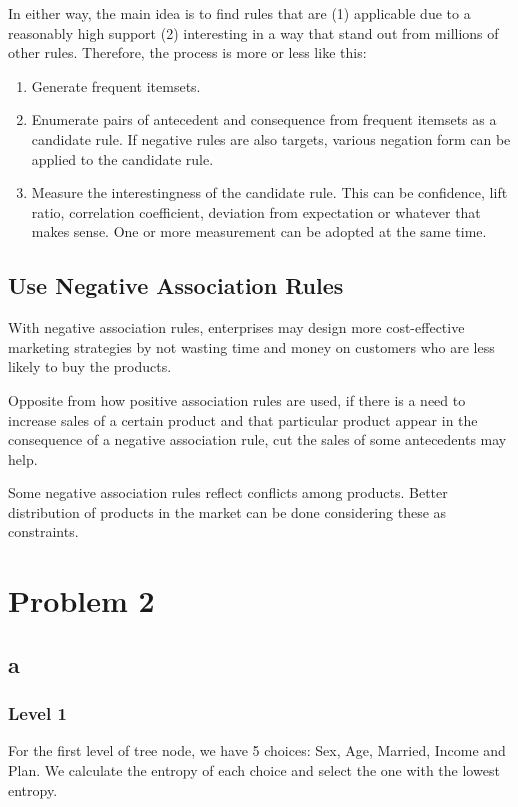 \documentclass[12pt]{article}
\begin{document}
In either way, the main idea is to find rules that are (1) applicable due to a reasonably high support (2) interesting in a way that stand out from millions of other rules. Therefore, the process is more or less like this:
\begin{enumerate}
	\item Generate frequent itemsets.
	\item Enumerate pairs of antecedent and consequence from frequent itemsets as a candidate rule. If negative rules are also targets, various negation form can be applied to the candidate rule.
	\item Measure the interestingness of the candidate rule. This can be confidence, lift ratio, correlation coefficient, deviation from expectation or whatever that makes sense. One or more measurement can be adopted at the same time.
\end{enumerate}

\subsection{Use Negative Association Rules} %
\label{sub:how_to_use_negative_association_rules}
With negative association rules, enterprises may design more cost-effective marketing strategies by not wasting time and money on customers who are less likely to buy the products.

Opposite from how positive association rules are used, if there is a need to increase sales of a certain product and that particular product appear in the consequence of a negative association rule, cut the sales of some antecedents may help.

Some negative association rules reflect conflicts among products. Better distribution of products in the market can be done considering these as constraints.

\section{Problem 2}
\subsection{a}
\subsubsection{Level 1}
For the first level of tree node, we have 5 choices: Sex, Age, Married, Income and Plan. We calculate the entropy of each choice and select the one with the lowest entropy.
\end{document}
